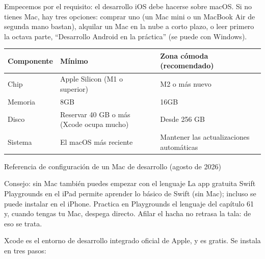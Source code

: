 


Empecemos por el requisito: el desarrollo iOS debe hacerse sobre macOS. Si no tienes Mac, hay tres opciones: comprar uno (un Mac mini o un MacBook Air de segunda mano bastan), alquilar un Mac en la nube a corto plazo, o leer primero la octava parte, “Desarrollo Android en la práctica” (se puede con Windows).

\begin{center}
\begin{tabularx}{\linewidth}{|X|X|X|}
\hline
\textbf{Componente} & \textbf{Mínimo} & \textbf{Zona cómoda (recomendado)} \tabularnewline
\hline
Chip & Apple Silicon (M1 o superior) & M2 o más nuevo \tabularnewline
Memoria & 8GB & 16GB \tabularnewline
Disco & Reservar 40 GB o más (Xcode ocupa mucho) & Desde 256 GB \tabularnewline
Sistema & El macOS más reciente & Mantener las actualizaciones automáticas \tabularnewline
\hline
\end{tabularx}
\end{center}

\begin{center}\small\color{gray}Referencia de configuración de un Mac de desarrollo (agosto de 2026)\end{center}

\begin{tcbinfo}{Consejo: sin Mac también puedes empezar con el lenguaje}
La app gratuita Swift Playgrounds en el iPad permite aprender lo básico de Swift (sin Mac); incluso se puede instalar en el iPhone. Practica en Playgrounds el lenguaje del capítulo 61 y, cuando tengas tu Mac, despega directo. Afilar el hacha no retrasa la tala: de eso se trata.

\end{tcbinfo}


Xcode es el entorno de desarrollo integrado oficial de Apple, y es gratis. Se instala en tres pasos:

